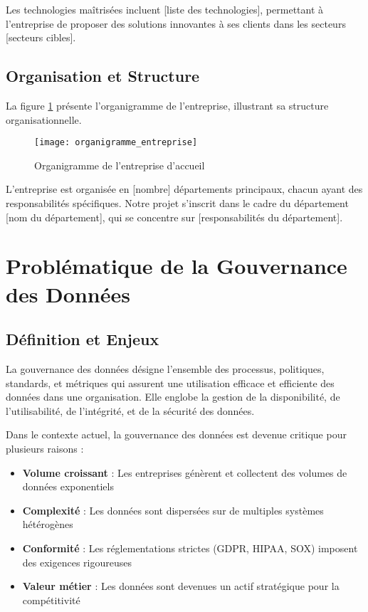 Les technologies maîtrisées incluent [liste des technologies], permettant à l'entreprise de proposer des solutions innovantes à ses clients dans les secteurs [secteurs cibles].

\subsection{Organisation et Structure}

La figure \ref{fig:organigramme} présente l'organigramme de l'entreprise, illustrant sa structure organisationnelle.

\begin{figure}[htpb]
\centering
\texttt{[image: organigramme\_entreprise]}
\caption{Organigramme de l'entreprise d'accueil}
\label{fig:organigramme}
\end{figure}

L'entreprise est organisée en [nombre] départements principaux, chacun ayant des responsabilités spécifiques. Notre projet s'inscrit dans le cadre du département [nom du département], qui se concentre sur [responsabilités du département].

\section{Problématique de la Gouvernance des Données}

\subsection{Définition et Enjeux}

La gouvernance des données désigne l'ensemble des processus, politiques, standards, et métriques qui assurent une utilisation efficace et efficiente des données dans une organisation. Elle englobe la gestion de la disponibilité, de l'utilisabilité, de l'intégrité, et de la sécurité des données.

Dans le contexte actuel, la gouvernance des données est devenue critique pour plusieurs raisons :
\begin{itemize}
    \item \textbf{Volume croissant} : Les entreprises génèrent et collectent des volumes de données exponentiels
    \item \textbf{Complexité} : Les données sont dispersées sur de multiples systèmes hétérogènes
    \item \textbf{Conformité} : Les réglementations strictes (GDPR, HIPAA, SOX) imposent des exigences rigoureuses
    \item \textbf{Valeur métier} : Les données sont devenues un actif stratégique pour la compétitivité
\end{itemize}

